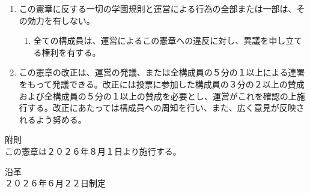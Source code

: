 \begin{enumerate}[label=第\arabic*条　]
  \item この憲章に反する一切の学園規則と運営による行為の全部または一部は、その効力を有しない。
    \begin{enumerate}[label=\arabic*　,start=2,leftmargin=*]
      \item 全ての構成員は、運営によるこの憲章への違反に対し、異議を申し立てる権利を有する。
    \end{enumerate}
  \item この憲章の改正は、運営の発議、または全構成員の５分の１以上による連署をもって発議できる。改正には投票に参加した構成員の３分の２以上の賛成および全構成員の５分の１以上の賛成を必要とし、運営がこれを確認の上施行する。改正にあたっては構成員への周知を行い、また、広く意見が反映されるよう努める。
\end{enumerate}

附則\\
この憲章は２０２６年８月１日より施行する。

沿革\\
２０２６年６月２２日制定